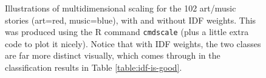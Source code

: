 \documentclass{article}
\begin{document}
\begin{figure}
\begin{center}
\end{center}
\caption{Illustrations of multidimensional scaling for the 102 art/music
  stories (art=red, music=blue), with and without IDF weights.  This was
  produced using the R command \texttt{cmdscale} (plus a little extra code to
  plot it nicely).  Notice that with IDF weights, the two classes are far more
  distinct visually, which comes through in the classification results in Table
  \ref{table:idf-is-good}.}
\label{fig:mds}
\end{figure}
\end{document}

